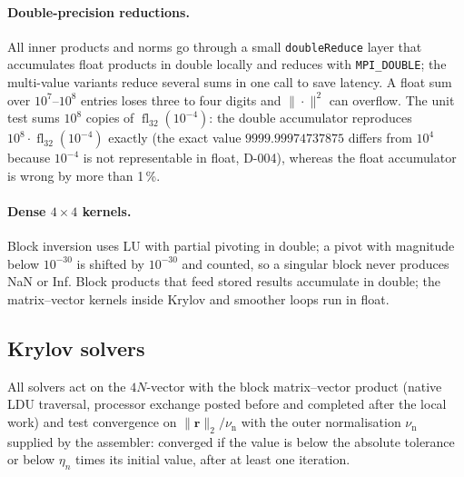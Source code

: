 \documentclass[11pt,a4paper]{article}
\newcommand{\vect}[1]{\mathbf{#1}}
\newcommand{\code}[1]{\texttt{#1}}
\begin{document}
\paragraph{Double-precision reductions.}
All inner products and norms go through a small \code{doubleReduce} layer
that accumulates float products in double locally and reduces with
\code{MPI\_DOUBLE}; the multi-value variants reduce several sums in one call
to save latency. A float sum over $10^7$--$10^8$ entries loses three to four
digits and $\|\cdot\|^2$ can overflow. The unit test sums $10^8$ copies of
$\operatorname{fl}_{32}(10^{-4})$: the double accumulator reproduces
$10^8\cdot\operatorname{fl}_{32}(10^{-4})$ exactly (the exact value
$9999.99974737875$ differs from $10^4$ because $10^{-4}$ is not representable
in float, D-004), whereas the float accumulator is wrong by more than
1\,\%.

\paragraph{Dense $4\times4$ kernels.}
Block inversion uses LU with partial pivoting in double; a pivot with
magnitude below $10^{-30}$ is shifted by $10^{-30}$ and counted, so a singular
block never produces NaN or Inf. Block products that feed stored results
accumulate in double; the matrix--vector kernels inside Krylov and smoother
loops run in float.

\subsection{Krylov solvers}\label{sec:krylov}

All solvers act on the $4N$-vector with the block matrix--vector product
(native LDU traversal, processor exchange posted before and completed after
the local work) and test convergence on
$\|\vect r\|_2/\nu_{\mathrm n}$ with the outer normalisation $\nu_{\mathrm n}$
supplied by the assembler: converged if the value is below the absolute
tolerance or below $\eta_n$ times its initial value, after at least one
iteration.
\end{document}
